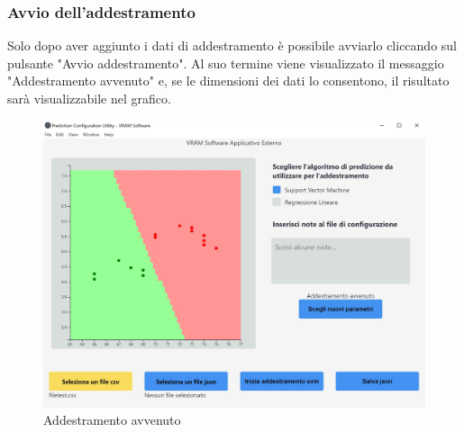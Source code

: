 		\subsubsection{Avvio dell'addestramento}
		Solo dopo aver aggiunto i dati di addestramento è possibile avviarlo cliccando sul pulsante "Avvio addestramento". Al suo termine viene visualizzato il messaggio "Addestramento avvenuto" e, se le dimensioni dei dati lo consentono, il risultato sarà visualizzabile nel grafico.
		\mbox{}
		\begin{figure} [H]
			\begin{center}
				\includegraphics[width=120mm]{./img/4.jpg}
			\end{center}
			\caption{Addestramento avvenuto}
		\end{figure}
		\mbox{}
